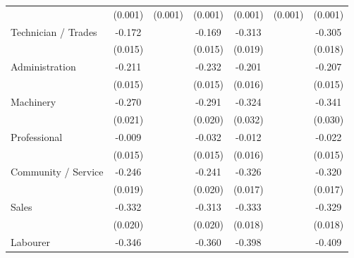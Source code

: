 {\begin{tabular}{l*{6}{c}}
                    &     (0.001)         &     (0.001)         &     (0.001)         &     (0.001)         &     (0.001)         &     (0.001)         \\
Technician / Trades &      -0.172\sym{***}&                     &      -0.169\sym{***}&      -0.313\sym{***}&                     &      -0.305\sym{***}\\
                    &     (0.015)         &                     &     (0.015)         &     (0.019)         &                     &     (0.018)         \\
Administration      &      -0.211\sym{***}&                     &      -0.232\sym{***}&      -0.201\sym{***}&                     &      -0.207\sym{***}\\
                    &     (0.015)         &                     &     (0.015)         &     (0.016)         &                     &     (0.015)         \\
Machinery           &      -0.270\sym{***}&                     &      -0.291\sym{***}&      -0.324\sym{***}&                     &      -0.341\sym{***}\\
                    &     (0.021)         &                     &     (0.020)         &     (0.032)         &                     &     (0.030)         \\
Professional        &      -0.009         &                     &      -0.032\sym{**} &      -0.012         &                     &      -0.022         \\
                    &     (0.015)         &                     &     (0.015)         &     (0.016)         &                     &     (0.015)         \\
Community / Service &      -0.246\sym{***}&                     &      -0.241\sym{***}&      -0.326\sym{***}&                     &      -0.320\sym{***}\\
                    &     (0.019)         &                     &     (0.020)         &     (0.017)         &                     &     (0.017)         \\
Sales               &      -0.332\sym{***}&                     &      -0.313\sym{***}&      -0.333\sym{***}&                     &      -0.329\sym{***}\\
                    &     (0.020)         &                     &     (0.020)         &     (0.018)         &                     &     (0.018)         \\
Labourer            &      -0.346\sym{***}&                     &      -0.360\sym{***}&      -0.398\sym{***}&                     &      -0.409\sym{***}\\

\end{tabular}}
